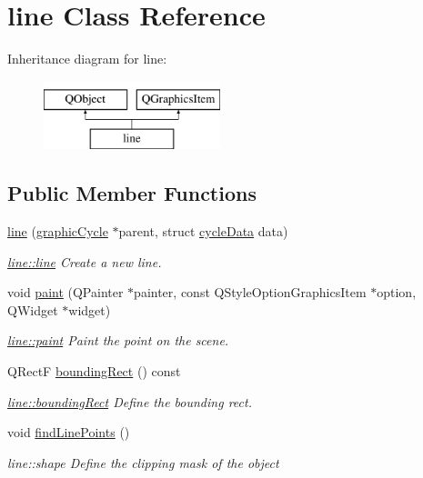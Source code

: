 \hypertarget{classline}{}\section{line Class Reference}
\label{classline}
Inheritance diagram for line\+:\begin{figure}[H]
\begin{center}
\leavevmode
\includegraphics[height=2.000000cm]{classline}
\end{center}
\end{figure}
\subsection*{Public Member Functions}
\begin{DoxyCompactItemize}
\item 
\mbox{\hyperlink{classline_a38ef6d493f122a35237517bc79653821}{line}} (\mbox{\hyperlink{classgraphic_cycle}{graphic\+Cycle}} $\ast$parent, struct \mbox{\hyperlink{structcycle_data}{cycle\+Data}} data)
\begin{DoxyCompactList}\small\item\em \mbox{\hyperlink{classline_a38ef6d493f122a35237517bc79653821}{line\+::line}} Create a new line. \end{DoxyCompactList}\item 
void \mbox{\hyperlink{classline_a128cee38b49baa22b618165edc900e81}{paint}} (Q\+Painter $\ast$painter, const Q\+Style\+Option\+Graphics\+Item $\ast$option, Q\+Widget $\ast$widget)
\begin{DoxyCompactList}\small\item\em \mbox{\hyperlink{classline_a128cee38b49baa22b618165edc900e81}{line\+::paint}} Paint the point on the scene. \end{DoxyCompactList}\item 
Q\+RectF \mbox{\hyperlink{classline_aecbda133a991abe5bb4080416c226e2f}{bounding\+Rect}} () const
\begin{DoxyCompactList}\small\item\em \mbox{\hyperlink{classline_aecbda133a991abe5bb4080416c226e2f}{line\+::bounding\+Rect}} Define the bounding rect. \end{DoxyCompactList}\item 
void \mbox{\hyperlink{classline_a0638608cbb7231dc4a55ea795e367748}{find\+Line\+Points}} ()
\begin{DoxyCompactList}\small\item\em line\+::shape Define the clipping mask of the object \end{DoxyCompactList}\end{DoxyCompactItemize}


